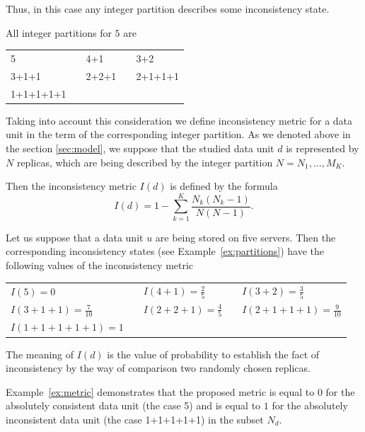 \documentclass[a4paper,14pt]{llncs}
\begin{document}
\noindent Thus, in this case any integer partition describes some inconsistency state.

\begin{example}\label{ex:partitions}
All integer partitions for $5$ are
\begin{center}
\begin{tabular}{lclcl}
	5 & & 4+1 & & 3+2\\
	3+1+1 &\hspace*{10pt}& 2+2+1 &\hspace*{10pt}& 2+1+1+1\\
	1+1+1+1+1
\end{tabular}
\end{center}
\end{example}

Taking into account this consideration we define inconsistency metric for a data unit in the term of the corresponding integer partition.
As we denoted above  in the section \ref{sec:model}, we suppose that the studied data unit $d$ is represented by $N$ replicas, which are being described by the integer partition $N=N_1,\ldots,M_K$.

Then the inconsistency metric $I(d)$ is defined by the formula
\begin{equation}\label{eq:metric}
	I(d)=1-\sum_{k=1}^K\dfrac{N_k(N_k-1)}{N(N-1)}.
\end{equation}

\begin{example}\label{ex:metric}
Let us suppose that a data unit $u$ are being stored on five servers.
Then the corresponding inconsistency states (see Example~\ref{ex:partitions}) have the following values of the inconsistency metric
\begin{center}
\begin{tabular}{lclcl}
	$I(5)=0$ & & $I(4+1)=\frac{2}{5}$ & & $I(3+2)=\frac{3}{5}$\\
	$I(3+1+1)=\frac{7}{10}$ &\hspace*{10pt}& $I(2+2+1)=\frac{4}{5}$
		&\hspace*{10pt}& $I(2+1+1+1)=\frac{9}{10}$\\
	$I(1+1+1+1+1)=1$
\end{tabular}
\end{center}
The meaning of $I(d)$ is the value of probability to establish the fact of inconsistency by the way of comparison two randomly chosen replicas.
\end{example}
Example~\ref{ex:metric} demonstrates that the proposed metric is equal to $0$ for the absolutely consistent data unit (the case 5) and is equal to $1$ for the absolutely inconsistent data unit (the case 1+1+1+1+1) in the subset $N_d$.
\end{document}
